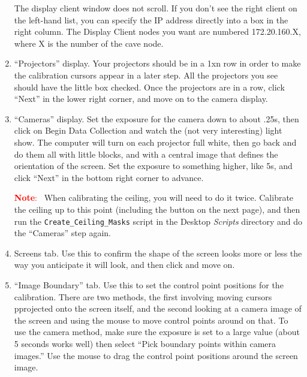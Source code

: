 \documentclass[11pt]{article}
\newenvironment{note}[1][Note]{\begin{lrbox}{\notebox}%
    \begin{minipage}{0.9\columnwidth}\textcolor{red}{\textbf{#1}:~}}%
    {\end{minipage}\end{lrbox}\begin{center}\setlength{\fboxsep}{8pt}%
    \fbox{\usebox{\notebox}}\end{center}}
\newcommand{\cmd}[1]{\texttt{#1}\xspace}
\newcommand{\dir}[1]{\textit{#1}\xspace}
\newcommand{\menu}[1]{``#1''\xspace}
\newcommand{\button}[1]{\framebox{\textsf{#1}\xspace}}
\begin{document}
\begin{enumerate}
The display client window does not scroll.  If you don't see the right
client on the left-hand list, you can specify the IP address directly
into a box in the right column.  The Display Client nodes you want are
numbered 172.20.160.X, where X is the number of the cave node.

\item \menu{Projectors} display.  Your projectors should be in a 1xn row in
  order to make the calibration cursors appear in a later step.  All
  the projectors you see should have the little box checked.  Once the
  projectors are in a row, click
  \menu{Next} in the lower right corner, and move on to the camera
  display.

\item \menu{Cameras} display.  Set the exposure for the camera down to
  about .25s, then click on {Begin Data Collection} and watch the (not
  very interesting) light show.  The computer will turn on each
  projector full white, then go back and do them all with little
  blocks, and with a central image that defines the orientation of the
  screen.  Set the exposure to something higher, like 5s, and click
  ``Next'' in the bottom right corner to advance.

\begin{note}
  When calibrating the ceiling, you will need to do it twice.
  Calibrate the ceiling up to this point (including the \button{Update
    Calibration} button on the next page), and then run the
  \cmd{Create\_Ceiling\_Masks} script in the Desktop \dir{Scripts}
  directory and do the \menu{Cameras} step again.
\end{note}

\item Screens tab.  Use this to confirm the shape of the screen looks
  more or less the way you anticipate it will look, and then click
  \button{Next} and move on.

\item \menu{Image Boundary} tab.  Use this to set the control point
  positions for the calibration.  There are two methods, the first
  involving moving cursors pprojected onto the screen itself, and the second
  looking at a camera image of the screen and using the mouse to move
  control points around on that.  To use the camera method, make sure
  the exposure is set to a large value (about 5 seconds works well) then
  select ``Pick boundary points within camera images.''  Use the mouse
  to drag the control point positions around the screen image.


\end{enumerate}
\end{document}
